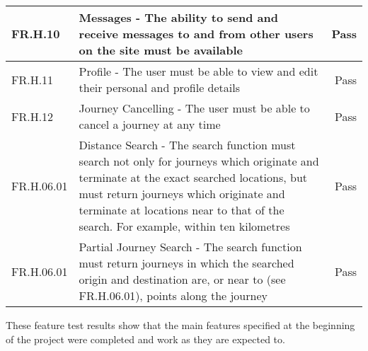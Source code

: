 \begin{longtable}{| l | p{9cm} | r |}
\hline
FR.H.10 & Messages - The ability to send and receive messages to and from other users on the site must be available & Pass \\
\hline
FR.H.11 & Profile - The user must be able to view and edit their personal and profile details & Pass \\
\hline
FR.H.12 & Journey Cancelling - The user must be able to cancel a journey at any time & Pass \\
\hline
FR.H.06.01 & Distance Search - The search function must search not only for journeys which originate and terminate at the exact searched locations, but must return journeys which originate and terminate at locations near to that of the search. For example, within ten kilometres & Pass \\
\hline
FR.H.06.01 & Partial Journey Search - The search function must return journeys in which the searched origin and destination are, or near to (see FR.H.06.01), points along the journey & Pass \\
\hline
\end{longtable}

These feature test results show that the main features specified at the beginning of the project were completed and work as they are expected to. 








